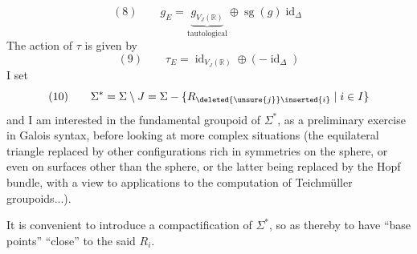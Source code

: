 \[
(8)\qquad g_E=\underbrace{g_{V_J(\mathbb R)}}_{\text{tautological}}\oplus\operatorname{sg}(g)\operatorname{id}_\Delta
\]
The action of $\tau$ is given by
\[
(9)\qquad\tau_E=\operatorname{id}_{V_J(\mathbb R)}\oplus(-\operatorname{id}_\Delta)
\]
I set
\[
(10)\qquad\Sigma^*=\Sigma\setminus J=\Sigma-\{R_{\deleted{\unsure{j}}\inserted{i}}\mid i\in I\}
\]
and I am interested in the fundamental groupoid of $\Sigma^*$, as a preliminary exercise in Galois syntax, before looking at  more complex situations (the equilateral triangle replaced by other configurations rich in symmetries on the sphere, or even on surfaces other than the sphere, or the latter being replaced by the Hopf bundle, with a view to applications to the computation of Teichmüller groupoids...).

It is convenient to introduce a compactification of $\Sigma^*$, so as thereby to have ``base points'' ``close'' to the said $R_i$.
